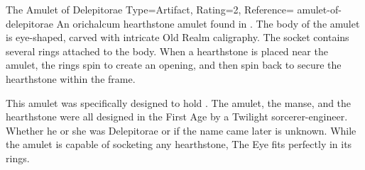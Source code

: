 ﻿


\begin{Merit}{The Amulet of Delepitorae}{%
    Type=Artifact,
    Rating=2,
    Reference=\cite*[p.~159]{ex3}
}{amulet-of-delepitorae}
    An orichalcum hearthstone amulet found in .
    The body of the amulet is eye-shaped, carved with intricate Old Realm
    caligraphy. The socket contains several rings attached to the body. When a
    hearthstone is placed near the amulet, the rings spin to create an opening,
    and then spin back to secure the hearthstone within the frame.

    This amulet was specifically designed to hold
    . The amulet, the manse, and the
    hearthstone were all designed in the First Age by a Twilight
    sorcerer-engineer. Whether he or she was Delepitorae or if the name came
    later is unknown. While the amulet is capable of socketing any hearthstone,
    The Eye fits perfectly in its rings.

\end{Merit}


